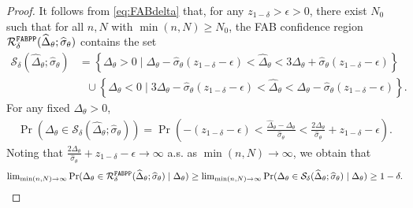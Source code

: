 \begin{proof}
    It follows from \cref{eq:FABdelta} that, for any $z_{1-\delta}>\epsilon>0$, there exist $N_0$ such that for all $n,N$ with $\min(n,N)\geq N_0$, the FAB confidence region $\mathcal R^{\mathrm{\texttt{FABPP}}}_\delta(\widehat{\Delta}_\theta; \widehat{\sigma}_\theta )$ contains the set
    \begin{align*}
        \mathcal S_\delta(\widehat{\Delta}_\theta; \widehat{\sigma}_\theta )&=\left \{\Delta_\theta>0 \mid \Delta_\theta - \widehat{\sigma}_\theta (z_{1-\delta}-\epsilon) < \widehat \Delta_\theta < 3\Delta_\theta +\widehat{\sigma}_\theta (z_{1-\delta}-\epsilon) \right\}\\
        &~~~\cup
        \left \{\Delta_\theta<0 \mid 3\Delta_\theta -\widehat{\sigma}_\theta (z_{1-\delta}-\epsilon) < \widehat \Delta_\theta <  \Delta_\theta - \widehat{\sigma}_\theta (z_{1-\delta}-\epsilon) \right\}.
    \end{align*}
    For any fixed $\Delta_\theta>0$,
    \begin{align}
        \Pr(\Delta_\theta\in \mathcal S_\delta(\widehat{\Delta}_\theta; \widehat{\sigma}_\theta ))=\Pr\left(-(z_{1-\delta}-\epsilon) <   \frac{\widehat\Delta_\theta-\Delta_\theta}{\widehat\sigma_\theta}<\frac{2\Delta_\theta}{\widehat\sigma_\theta} +z_{1-\delta}-\epsilon \right).
    \end{align}
    Noting that $\frac{2\Delta_\theta}{\widehat\sigma_\theta} +z_{1-\delta}-\epsilon\to\infty$ a.s. as $\min(n,N)\to\infty$, we obtain that
    \begin{align}
        {\lim}_{\min(n,N)\to\infty}\Pr(\Delta_\theta \in \mathcal R^{\mathrm{\texttt{FABPP}}}_\delta(\widehat{\Delta}_\theta; \widehat{\sigma}_\theta )\mid \Delta_\theta)
        \geq {\lim}_{\min(n,N)\to\infty}\Pr(\Delta_\theta \in \mathcal S_\delta(\widehat{\Delta}_\theta; \widehat{\sigma}_\theta )\mid \Delta_\theta)
        \geq 1-\delta.
    \end{align}
\end{proof}

